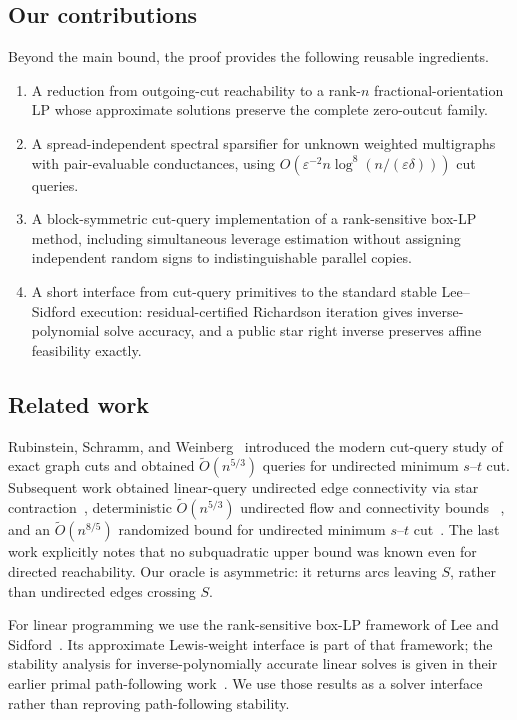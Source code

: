 \documentclass[11pt]{article}
\theoremstyle{definition}
\newcommand{\eps}{\varepsilon}
\begin{document}
\subsection{Our contributions}

Beyond the main bound, the proof provides the following reusable ingredients.
\begin{enumerate}[label=(\roman*)]
\item A reduction from outgoing-cut reachability to a rank-$n$
      fractional-orientation LP whose approximate solutions preserve the
      complete zero-outcut family.
\item A spread-independent spectral sparsifier for unknown weighted
      multigraphs with pair-evaluable conductances, using
      $O(\eps^{-2}n\log^8(n/(\eps\delta)))$ cut queries.
\item A block-symmetric cut-query implementation of a rank-sensitive box-LP
      method, including simultaneous leverage estimation without assigning
      independent random signs to indistinguishable parallel copies.
\item A short interface from cut-query primitives to the standard stable
      Lee--Sidford execution: residual-certified Richardson iteration gives
      inverse-polynomial solve accuracy, and a public star right inverse
      preserves affine feasibility exactly.
\end{enumerate}

\subsection{Related work}

Rubinstein, Schramm, and Weinberg~\cite{RubinsteinSchrammWeinberg2018}
introduced the modern cut-query study of exact graph cuts and obtained
$\widetilde O(n^{5/3})$ queries for undirected minimum $s$--$t$ cut.
Subsequent work obtained linear-query undirected edge connectivity via star
contraction~\cite{ApersEtAl2022}, deterministic
$\widetilde O(n^{5/3})$ undirected flow and connectivity bounds
~\cite{AnandSaranurakWang2025}, and an
$\widetilde O(n^{8/5})$ randomized bound for undirected minimum $s$--$t$
cut~\cite{JiangNanongkaiSawettamalya2026}.  The last work explicitly notes
that no subquadratic upper bound was known even for directed reachability.
Our oracle is asymmetric: it returns arcs leaving $S$, rather than undirected
edges crossing $S$.

For linear programming we use the rank-sensitive box-LP framework of Lee and
Sidford~\cite{LeeSidford2020}.  Its approximate Lewis-weight interface is
part of that framework; the stability analysis for inverse-polynomially
accurate linear solves is given in their earlier primal path-following
work~\cite[Section~8]{LeeSidfordPathII}.  We use those results as a solver
interface rather than reproving path-following stability.
\end{document}

